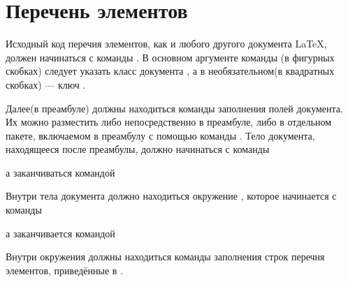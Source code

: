
\section{Перечень элементов}

Исходный код перечня элементов, как и любого другого документа \LaTeX{}, должен
начинаться с команды . В основном аргументе команды%
(в фигурных скобках) следует указать класс документа , а в
необязательном(в квадратных скобках) --- ключ .


Далее(в преамбуле) должны находиться команды заполнения полей документа. Их можно
разместить либо непосредственно в преамбуле, либо в отдельном пакете, включаемом в
преамбулу с помощью команды . Тело документа,
находящееся после преамбулы, должно начинаться с команды


а заканчиваться командой


Внутри тела документа должно находиться
окружение , которое начинается с команды


а заканчивается командой


Внутри окружения  должны находиться команды заполнения строк
перечня элементов, приведённые в .\newpage

